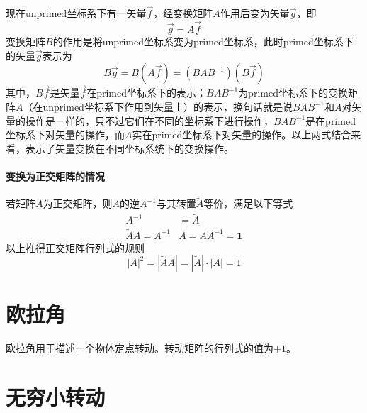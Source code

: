 现在unprimed坐标系下有一矢量$\vec{f}$，经变换矩阵$A$作用后变为矢量$\vec{g}$，即
\begin{equation}
	\vec{g} = A \vec{f}
\end{equation}
变换矩阵$B$的作用是将unprimed坐标系变为primed坐标系，此时primed坐标系下的矢量$\vec{g}$表示为
\begin{equation}
	B\vec{g} = B(A\vec{f}) = (BAB^{-1})(B\vec{f})
\end{equation}
其中，$B\vec{f}$是矢量$\vec{f}$在primed坐标系下的表示；$BAB^{-1}$为primed坐标系下的变换矩阵$A$（在unprimed坐标系下作用到矢量上）的表示，换句话就是说$BAB^{-1}$和$A$对矢量的操作是一样的，只不过它们在不同的坐标系下进行操作，$BAB^{-1}$是在primed坐标系下对矢量的操作，而$A$实在primed坐标系下对矢量的操作。以上两式结合来看，表示了矢量变换在不同坐标系统下的变换操作。


\paragraph*{变换为正交矩阵的情况}
若矩阵$A$为正交矩阵，则$A$的逆$A^{-1}$与其转置$\tilde{A}$等价，满足以下等式
\begin{equation}
	\begin{aligned}
		A^{-1} &= \tilde{A} \\
		\tilde{A}A = A^{-1}&A = AA^{-1} = \bm{1}
	\end{aligned}
\end{equation}
以上推得正交矩阵行列式的规则
\begin{equation}
	|A|^2 = |\tilde{A}A| = |\tilde{A}|\cdot|A| = 1
\end{equation}

\section{欧拉角}
欧拉角用于描述一个物体定点转动。转动矩阵的行列式的值为$+1$。

\section{无穷小转动}
